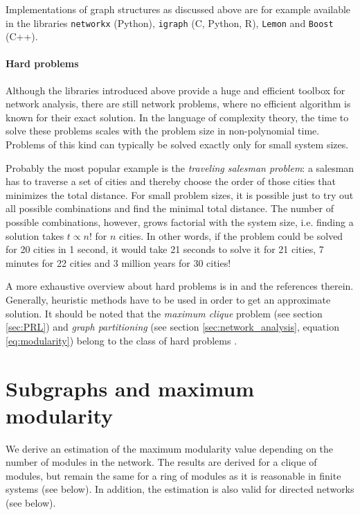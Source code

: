 Implementations of graph structures as discussed above are for example available in the libraries \verb"networkx" (Python), \verb"igraph" (C, Python, R), \verb"Lemon" and \verb"Boost" (C++).

\paragraph{Hard problems\color{Cayenne}{.}}
Although the libraries introduced above provide a huge and efficient toolbox for network analysis, there are still network problems, where no efficient algorithm is known for their exact solution.
In the language of complexity theory, the time to solve these problems scales with the problem size in non-polynomial time.
Problems of this kind can typically be solved exactly only for small system sizes.

Probably the most popular example is the \emph{traveling salesman problem}: a salesman has to traverse a set of cities and thereby choose the order of those cities that minimizes the total distance.
For small problem sizes, it is possible just to try out all possible combinations and find the minimal total distance.
The number of possible combinations, however, grows factorial with the system size, i.e. finding a solution takes $t\propto n!$ for $n$ cities.
In other words, if the problem could be solved for 20 cities in 1 second, it would take 21 seconds to solve it for 21 cities, 7 minutes for 22 cities and 3 million years for 30 cities!

A more exhaustive overview about hard problems is in \citep{algorithm_design} and the references therein.
Generally, heuristic methods have to be used in order to get an approximate solution.
It should be noted that the \emph{maximum clique} problem (see section \ref{sec:PRL}) and \emph{graph partitioning} (see section \ref{sec:network_analysis}, equation \eqref{eq:modularity}) belong to the class of hard problems \citep{brandes2007}.

\section{Subgraphs and maximum modularity}\label{sec:maximum_modularity_subgraphs}
We derive an estimation of the maximum modularity value depending on the number of modules in the network.
The results are derived for a clique of modules, but remain the same for a ring of modules as it is reasonable in finite systems (see below).
In addition, the estimation is also valid for directed networks (see below).

